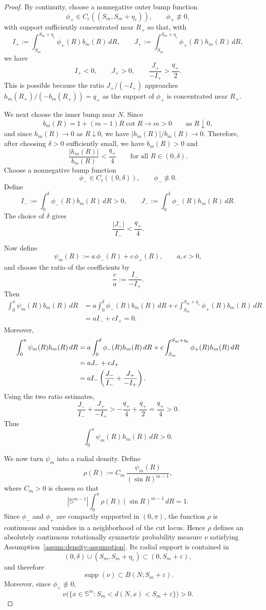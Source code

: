 \documentclass{amsart}
\theoremstyle{definition}
\theoremstyle{remark}
\newcommand\0{\boldsymbol{0}}
\begin{document}
\begin{proof}
By continuity, choose a nonnegative outer bump function
\[
\phi_+\in C_c((S_m,S_m+\eta_\varepsilon)),
\qquad
\phi_+\not\equiv0,
\]
with support sufficiently concentrated near \(R_+\) so that, with
\[
I_+:=\int_{S_m}^{S_m+\eta_\varepsilon}\phi_+(R)b_m(R)\,dR,
\qquad
J_+:=\int_{S_m}^{S_m+\eta_\varepsilon}\phi_+(R)h_m(R)\,dR,
\]
we have
\[
I_+<0,\qquad J_+>0,\qquad \frac{J_+}{-I_+}>\frac{q_+}{2}.
\]
This is possible because the ratio \(J_+/(-I_+)\) approaches \(h_m(R_+)/(-b_m(R_+))=q_+\) as the support of \(\phi_+\) is concentrated near \(R_+\).

We next choose the inner bump near \(N\). Since
\[
b_m(R)=1+(m-1)R\cot R\longrightarrow m>0
\qquad\text{as }R\downarrow0,
\]
and since \(h_m(R)\to0\) as \(R\downarrow0\), we have \(|h_m(R)|/b_m(R)\to0\). Therefore, after choosing \(\delta>0\) sufficiently small, we have \(b_m(R)>0\) and
\[
\frac{|h_m(R)|}{b_m(R)}<\frac{q_+}{4}
\qquad\text{for all }R\in(0,\delta).
\]
Choose a nonnegative bump function
\[
\phi_-\in C_c((0,\delta)),
\qquad
\phi_-\not\equiv0.
\]
Define
\[
I_-:=\int_0^\delta \phi_-(R)b_m(R)\,dR>0,
\qquad
J_-:=\int_0^\delta \phi_-(R)h_m(R)\,dR.
\]
The choice of \(\delta\) gives
\[
\frac{|J_-|}{I_-}<\frac{q_+}{4}.
\]

Now define
\[
\psi_m(R):=a\,\phi_-(R)+c\,\phi_+(R),
\qquad a,c>0,
\]
and choose the ratio of the coefficients by
\[
\frac{c}{a}:=\frac{I_-}{-I_+}.
\]
Then
\begin{equation}
\begin{aligned}
\int_0^\pi \psi_m(R)b_m(R)\,dR
&=
a\int_0^\delta \phi_-(R)b_m(R)\,dR
+
c\int_{S_m}^{S_m+\eta_\varepsilon}\phi_+(R)b_m(R)\,dR \\
&=
aI_-+cI_+
=
0.
\end{aligned}
\end{equation}
Moreover,
\begin{align}
\int_0^\pi \psi_m(R)h_m(R)\,dR
&=
a\int_0^\delta \phi_-(R)h_m(R)\,dR
+
c\int_{S_m}^{S_m+\eta_\varepsilon}\phi_+(R)h_m(R)\,dR \notag\\
&=
aJ_-+cJ_+ \notag\\
&=
aI_-\left(\frac{J_-}{I_-}+\frac{J_+}{-I_+}\right).
\end{align}
Using the two ratio estimates,
\[
\frac{J_-}{I_-}+\frac{J_+}{-I_+}
>
-\frac{q_+}{4}+\frac{q_+}{2}
=
\frac{q_+}{4}>0.
\]
Thus
\[
\int_0^\pi \psi_m(R)h_m(R)\,dR>0.
\]

We now turn \(\psi_m\) into a radial density. Define
\[
\rho(R):=
C_m\,\frac{\psi_m(R)}{(\sin R)^{m-1}},
\]
where \(C_m>0\) is chosen so that
\[
|\mathbb S^{m-1}|
\int_0^\pi \rho(R)(\sin R)^{m-1}\,dR
=
1.
\]
Since \(\phi_-\) and \(\phi_+\) are compactly supported in \((0,\pi)\), the function \(\rho\) is continuous and vanishes in a neighborhood of the cut locus. Hence \(\rho\) defines an absolutely continuous rotationally symmetric probability measure \(\nu\) satisfying Assumption~\ref{assum:density-assumption}. Its radial support is contained in
\[
(0,\delta)\cup(S_m,S_m+\eta_\varepsilon)
\subset(0,S_m+\varepsilon),
\]
and therefore
\[
\operatorname{supp}(\nu)\subset B(N;S_m+\varepsilon).
\]
Moreover, since \(\phi_+\not\equiv0\),
\[
\nu\bigl(\{x\in\mathbb S^m:S_m<d(N,x)<S_m+\varepsilon\}\bigr)>0.
\]


\end{proof}
\end{document}
